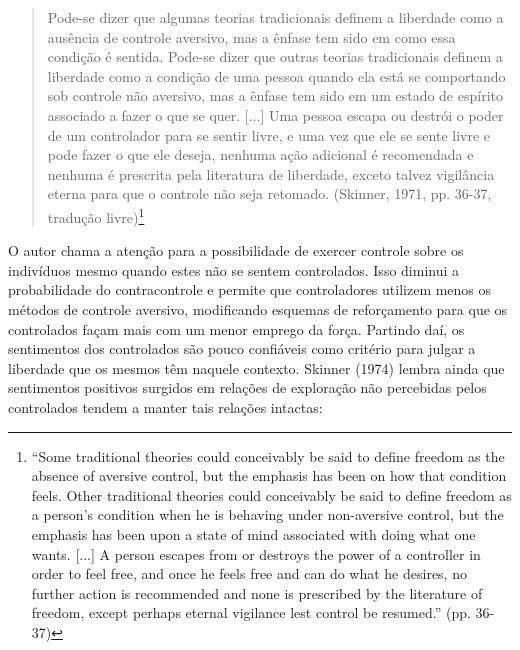\begin{quote}
    Pode-se dizer que algumas teorias tradicionais definem a liberdade como a ausência de controle aversivo, mas a ênfase tem sido em como essa condição é sentida. Pode-se dizer que outras teorias tradicionais definem a liberdade como a condição de uma pessoa quando ela está se comportando sob controle não aversivo, mas a ênfase tem sido em um estado de espírito associado a fazer o que se quer. [...] Uma pessoa escapa ou destrói o poder de um controlador para se sentir livre, e uma vez que ele se sente livre e pode fazer o que ele deseja, nenhuma ação adicional é recomendada e nenhuma é prescrita pela literatura de liberdade, exceto talvez vigilância eterna para que o controle não seja retomado. (Skinner, 1971, pp. 36-37, tradução livre)\footnote{``Some traditional theories could conceivably be said to define freedom as the absence of aversive control, but the emphasis has been on how that condition feels. Other traditional theories could conceivably be said to define freedom as a person's condition when he is behaving under non-aversive control, but the emphasis has been upon a state of mind associated with doing what one wants. [...] A person escapes from or destroys the power of a controller in order to feel free, and once he feels free and can do what he desires, no further action is recommended and none is prescribed by the literature of freedom, except perhaps eternal vigilance lest control be resumed.'' (pp. 36-37)}
\end{quote}

O autor chama a atenção para a possibilidade de exercer controle sobre os indivíduos mesmo quando estes não se sentem controlados. Isso diminui a probabilidade do contracontrole e permite que controladores utilizem menos os métodos de controle aversivo, modificando esquemas de reforçamento para que os controlados façam mais com um menor emprego da força. Partindo daí, os sentimentos dos controlados são pouco confiáveis como critério para julgar a liberdade que os mesmos têm naquele contexto. Skinner (1974) lembra ainda que sentimentos positivos surgidos em relações de exploração não percebidas pelos controlados tendem a manter tais relações intactas:

